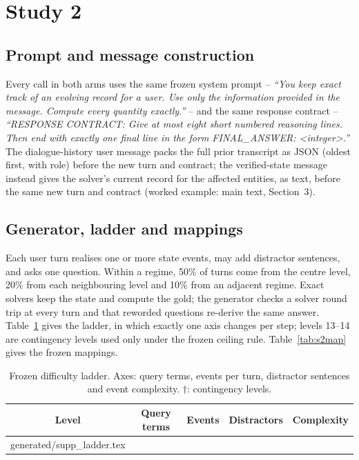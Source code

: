 \documentclass[10pt]{article}
\makeatletter
\newcommand{\inputtable}[1]{\@@input #1 }
\makeatother
\begin{document}
\section{Study 2}

\subsection{Prompt and message construction}
\label{sec:s2-prompt}
Every call in both arms uses the same frozen system prompt -- \emph{``You keep
exact track of an evolving record for a user. Use only the information
provided in the message. Compute every quantity exactly.''} -- and the same
response contract -- \emph{``RESPONSE CONTRACT: Give at most eight short
numbered reasoning lines. Then end with exactly one final line in the form
FINAL\_ANSWER: <integer>.''} The dialogue-history user message packs the full
prior transcript as JSON (oldest first, with role) before the new turn and
contract; the verified-state message instead gives the solver's current
record for the affected entities, as text, before the same new turn and
contract (worked example: main text, Section~3).

\subsection{Generator, ladder and mappings}
\label{sec:s2-generator}
Each user turn realises one or more state events, may add distractor
sentences, and asks one question. Within a regime, 50\% of turns come from the
centre level, 20\% from each neighbouring level and 10\% from an adjacent
regime. Exact solvers keep the state and compute the
gold; the generator checks a solver round trip at every turn and that reworded
questions re-derive the same answer. Table~\ref{tab:ladder} gives the ladder, in
which exactly one axis changes per step; levels 13--14 are contingency levels
used only under the frozen ceiling rule. Table~\ref{tab:s2map} gives the frozen
mappings.

\begin{table}[h]\centering\small
\caption{Frozen difficulty ladder. Axes: query terms, events per turn,
distractor sentences and event complexity. $\dagger$: contingency levels.}
\label{tab:ladder}
\begin{tabular}{ccccc}\toprule
Level & Query terms & Events & Distractors & Complexity\\\midrule
\inputtable{generated/supp_ladder.tex}
\bottomrule\end{tabular}\end{table}
\end{document}
